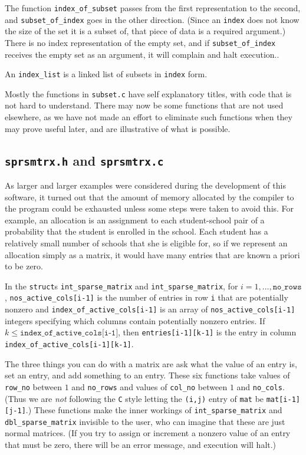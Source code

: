 \documentclass[12pt]{article}
\theoremstyle{definition}
\begin{document}
\begin{appendix}
The function \texttt{index\_of\_subset} passes from the first
representation to the second, and \texttt{subset\_of\_index} goes in
the other direction.  (Since an \texttt{index} does not know the size
of the set it is a subset of, that piece of data is a required
argument.) There is no index representation of the empty set, and if
\texttt{subset\_of\_index} receives the empty set as an argument, it
will complain and halt execution..

An \texttt{index\_list} is a linked list of subsets in \texttt{index}
form.  

Mostly the functions in \texttt{subset.c} have self explanatory
titles, with code that is not hard to understand.  There may now be
some functions that are not used elsewhere, as we have not made an
effort to eliminate such functions when they may prove useful later,
and are illustrative of what is possible.

\subsection{\texttt{sprsmtrx.h} and \texttt{sprsmtrx.c}}

As larger and larger examples were considered during the development
of this software, it turned out that the amount of memory allocated by
the compiler to the program could be exhausted unless some steps were
taken to avoid this.  For example, an allocation is an assignment to
each student-school pair of a probability that the student is enrolled
in the school.  Each student has a relatively small number of schools
that she is eligible for, so if we represent an allocation simply as a
matrix, it would have many entries that are known a priori to be zero.

In the \texttt{struct}s \texttt{int\_sparse\_matrix} and
\texttt{int\_sparse\_matrix}, for $i = 1, \ldots, \mathtt{no\_rows}$,
\texttt{nos\_active\_cols[i-1]} is the number of entries in row
\texttt{i} that are potentially nonzero and
\texttt{index\_of\_active\_cols[i-1]} is an array of
\texttt{nos\_active\_cols[i-1]} integers specifying which columns
contain potentially nonzero entries.  If $k \le
\texttt{index\_of\_active\_cols[i-1]}$, then
\texttt{entries[i-1][k-1]} is the entry in column
\texttt{index\_of\_active\_cols[i-1][k-1]}.

The three things you can do with a matrix are ask what the value of an
entry is, set an entry, and add something to an entry.  These six
functions take values of \texttt{row\_no} between $1$ and
\texttt{no\_rows} and values of \texttt{col\_no} between $1$ and
\texttt{no\_cols}.  (Thus we are \emph{not} following the \texttt{C}
style letting the \texttt{(i,j)} entry of \texttt{mat} be
\texttt{mat[i-1][j-1]}.)  These functions make the inner workings of
\texttt{int\_sparse\_matrix} and \texttt{dbl\_sparse\_matrix}
invisible to the user, who can imagine that these are just normal
matrices.  (If you try to assign or increment a nonzero value of an
entry that must be zero, there will be an error message, and execution
will halt.)


\end{appendix}
\end{document}
